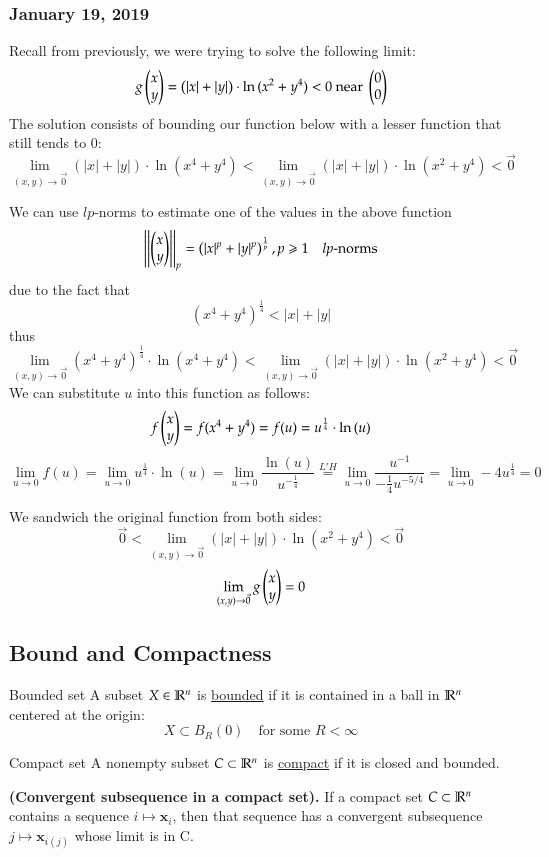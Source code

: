 \subsubsection*{January 19, 2019}

Recall from previously, we were trying to solve the following limit:
\[g\begin{pmatrix} x \\ y \end{pmatrix}= \left( |x|+|y| \right)\cdot \ln{(x^2+y^4)}<0 \text{ near }\begin{pmatrix} 0 \\ 0 \end{pmatrix}\]
The solution consists of bounding our function below with a lesser function that still tends to 0: 
\[\lim_{(x,y)\to \vec{0}}(|x|+|y|)\cdot \ln{(x^4+y^4)}<\lim_{(x,y)\to \vec{0}}(|x|+|y|)\cdot \ln{(x^2+y^4)}<\vec{0}\]

We can use $lp$-norms to estimate one of the values in the above function
\[\left|\left| \begin{pmatrix} x \\ y \end{pmatrix}\right|\right|_p=\left(|x|^p + |y|^p\right)^{\frac{1}{p}}, p\geqslant 1\quad lp\text{-norms}\]
due to the fact that
\[(x^4+y^4)^{\frac{1}{4}} < |x| + |y|\]
thus
\[\lim_{(x,y)\to \vec{0}}(x^4+y^4)^{\frac{1}{4}}\cdot \ln{(x^4+y^4)}<\lim_{(x,y)\to \vec{0}}(|x|+|y|)\cdot \ln{(x^2+y^4)}<\vec{0}\]
We can substitute $u$ into this function as follows: 
\[f\begin{pmatrix} x \\ y \end{pmatrix}=f(x^4+y^4)=f(u)=u^{\frac{1}{4}}\cdot \ln{(u)}\]
\[\lim_{u\rightarrow 0} f(u)=\lim_{u\rightarrow 0} u^{\frac{1}{4}}\cdot \ln{(u)}=\lim_{u\rightarrow 0} \frac{\ln{(u)}}{u^{-\frac{1}{4}}}\stackrel{L'H}{=}\lim_{u\rightarrow 0} \frac{u^{-1}}{-\frac{1}{4}u^{-5/4}}=\lim_{u\rightarrow 0}-4u^{\frac{1}{4}}=0\]

We sandwich the original function from both sides: 
\[\vec{0}<\lim_{(x,y)\to \vec{0}}(|x|+|y|)\cdot \ln{(x^2+y^4)}<\vec{0}\]
\[\lim_{(x,y)\to \vec{0}} g\begin{pmatrix} x \\ y \end{pmatrix} = 0\]

\newpage

\subsection{Bound and Compactness}
\begin{defn}{Bounded set}
A subset $X\in \mathbb{R}^n$ is \ul{bounded} if it is contained in a ball in $\mathbb{R}^n$ centered at the origin:
  \begin{equation}
  	X\subset B_R(0)\quad \text{for some }R<\infty
  \end{equation}
\end{defn}

\begin{defn}{Compact set}
A nonempty subset $C\subset \mathbb{R}^n$ is \ul{compact} if it is closed and bounded.
\end{defn}

\begin{theorem}
  \textbf{(Convergent subsequence in a compact set).} If a compact set $C\subset \mathbb{R}^n$ contains a sequence $i\mapsto \bm{x}_i$, then that sequence has a convergent subsequence $j\mapsto \bm{x}_{i(j)}$ whose limit is in C.
\end{theorem}
